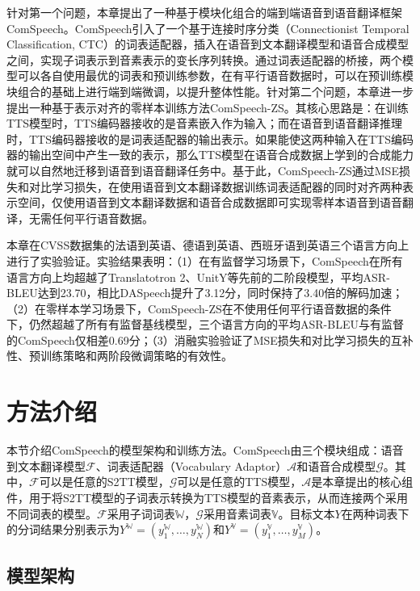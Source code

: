 针对第一个问题，本章提出了一种基于模块化组合的端到端语音到语音翻译框架ComSpeech。ComSpeech引入了一个基于连接时序分类（Connectionist Temporal Classification, CTC）\citep{ctc}的词表适配器，插入在语音到文本翻译模型和语音合成模型之间，实现子词表示到音素表示的变长序列转换。通过词表适配器的桥接，两个模型可以各自使用最优的词表和预训练参数，在有平行语音数据时，可以在预训练模块组合的基础上进行端到端微调，以提升整体性能。针对第二个问题，本章进一步提出一种基于表示对齐的零样本训练方法ComSpeech-ZS。其核心思路是：在训练TTS模型时，TTS编码器接收的是音素嵌入作为输入；而在语音到语音翻译推理时，TTS编码器接收的是词表适配器的输出表示。如果能使这两种输入在TTS编码器的输出空间中产生一致的表示，那么TTS模型在语音合成数据上学到的合成能力就可以自然地迁移到语音到语音翻译任务中。基于此，ComSpeech-ZS通过MSE损失和对比学习损失，在使用语音到文本翻译数据训练词表适配器的同时对齐两种表示空间，仅使用语音到文本翻译数据和语音合成数据即可实现零样本语音到语音翻译，无需任何平行语音数据。

本章在CVSS数据集的法语到英语、德语到英语、西班牙语到英语三个语言方向上进行了实验验证。实验结果表明：（1）在有监督学习场景下，ComSpeech在所有语言方向上均超越了Translatotron 2、UnitY等先前的二阶段模型，平均ASR-BLEU达到23.70，相比DASpeech提升了3.12分，同时保持了3.40倍的解码加速；（2）在零样本学习场景下，ComSpeech-ZS在不使用任何平行语音数据的条件下，仍然超越了所有有监督基线模型，三个语言方向的平均ASR-BLEU与有监督的ComSpeech仅相差0.69分；（3）消融实验验证了MSE损失和对比学习损失的互补性、预训练策略和两阶段微调策略的有效性。


\section{方法介绍}

本节介绍ComSpeech的模型架构和训练方法。ComSpeech由三个模块组成：语音到文本翻译模型$\mathcal{F}$、词表适配器（Vocabulary Adaptor）$\mathcal{A}$和语音合成模型$\mathcal{G}$。其中，$\mathcal{F}$可以是任意的S2TT模型，$\mathcal{G}$可以是任意的TTS模型，$\mathcal{A}$是本章提出的核心组件，用于将S2TT模型的子词表示转换为TTS模型的音素表示，从而连接两个采用不同词表的模型。$\mathcal{F}$采用子词词表$\mathbb{W}$，$\mathcal{G}$采用音素词表$\mathbb{V}$。目标文本$Y$在两种词表下的分词结果分别表示为$Y^{\mathbb{W}} = (y^{\mathbb{W}}_1, \ldots, y^{\mathbb{W}}_N)$和$Y^{\mathbb{V}} = (y^{\mathbb{V}}_1, \ldots, y^{\mathbb{V}}_M)$。

\subsection{模型架构}\label{sec:comspeech_arch}

